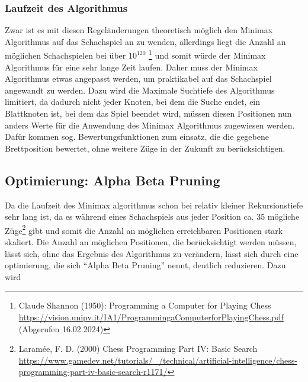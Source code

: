 \documentclass[12pt, a4paper, oneside, openright]{article}
\newcommand \sog{sog.\xspace }
\newcommand \ca{ca.\xspace }
\begin{document}
\subsubsection{Laufzeit des Algorithmus}
Zwar ist es mit diesen Regeländerungen theoretisch möglich den Minimax Algorithmus auf das Schachspiel an zu wenden, allerdings liegt die Anzahl an möglichen Schachspielen bei  über $ 10^{120} $ \footnote{Claude Shannon (1950): Programming a Computer for Playing Chess \url{https://vision.unipv.it/IA1/ProgrammingaComputerforPlayingChess.pdf} (Abgerufen 16.02.2024)} und somit würde der Minimax Algorithmus für eine sehr lange Zeit laufen.
Daher muss der Minimax Algorithmus etwas angepasst werden, um praktikabel auf das Schachspiel angewandt zu werden.
Dazu wird die Maximale Suchtiefe des Algorithmus limitiert, da dadurch nicht jeder Knoten, bei dem die Suche endet, ein Blattknoten ist, bei dem das Spiel beendet wird, müssen diesen Positionen nun anders Werte für die Anwendung des Minimax Algorithmus zugewiesen werden.
Dafür kommen \sog Bewertungsfunktionen zum einsatz, die die gegebene Brettposition bewertet, ohne weitere Züge in der Zukunft zu berücksichtigen\footnotemark[3].


\subsection{Optimierung: Alpha Beta Pruning}\label{subsec:optimierung:-alpha-beta-pruning}
Da die Laufzeit des Minimax algorithmus schon bei relativ kleiner Rekursionstiefe sehr lang ist, da es während eines Schachspiels aus jeder Position \ca 35 mögliche Züge\footnote{Laramée, F. D. (2000)  Chess Programming Part IV: Basic Search \url{https://www.gamedev.net/tutorials/_/technical/artificial-intelligence/chess-programming-part-iv-basic-search-r1171/}} gibt und somit die Anzahl an möglichen erreichbaren Positionen stark skaliert.
Die Anzahl an möglichen Positionen, die berücksichtigt werden müssen, lässt sich, ohne das Ergebnis des Algorithmus zu verändern, lässt sich durch eine optimierung, die sich \enquote{Alpha Beta Pruning} nennt, deutlich reduzieren.
Dazu wird
\end{document}
